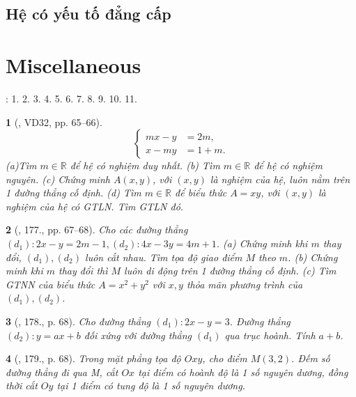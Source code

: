 \documentclass{article}
\newtheorem{baitoan}{}
\begin{document}
\subsection{Hệ có yếu tố đẳng cấp}


\section{Miscellaneous}
\cite[BTCCI, pp. 26--27]{SGK_Toan_9_Canh_Dieu_tap_1}: 1. 2. 3. 4. 5. 6. 7. 8. 9. 10. 11.

\begin{baitoan}[\cite{Tuyen_Toan_9_old}, VD32, pp. 65--66]
	\begin{equation*}
		\left\{\begin{split}
			mx - y &= 2m,\\
			x - my &= 1 + m.
		\end{split}\right.
	\end{equation*}
	(a)Tìm $m\in\mathbb{R}$ để hệ có nghiệm duy nhất. (b) Tìm $m\in\mathbb{R}$ để hệ có nghiệm nguyên. (c) Chứng minh $A(x,y)$, với $(x,y)$ là nghiệm của hệ, luôn nằm trên 1 đường thẳng cố định. (d) Tìm $m\in\mathbb{R}$ để biểu thức $A = xy$, với $(x,y)$ là nghiệm của hệ  có {\rm GTLN}. Tìm {\rm GTLN} đó.
\end{baitoan}

\begin{baitoan}[\cite{Tuyen_Toan_9_old}, 177., pp. 67--68]
	Cho các đường thẳng $(d_1):2x - y = 2m - 1,(d_2):4x - 3y = 4m + 1$. (a) Chứng minh khi $m$ thay đổi, $(d_1),(d_2)$ luôn cắt nhau. Tìm tọa độ giao điểm $M$ theo $m$. (b) Chứng minh khi $m$ thay đổi thì $M$ luôn di động trên 1 đường thẳng cố định. (c) Tìm {\rm GTNN} của biểu thức $A = x^2 + y^2$ với $x,y$ thỏa mãn phương trình của $(d_1),(d_2)$.
\end{baitoan}

\begin{baitoan}[\cite{Tuyen_Toan_9_old}, 178., p. 68]
	Cho đường thẳng $(d_1):2x - y = 3$. Đường thẳng $(d_2):y = ax + b$ đối xứng với đường thẳng $(d_1)$ qua trục hoành. Tính $a + b$.
\end{baitoan}

\begin{baitoan}[\cite{Tuyen_Toan_9_old}, 179., p. 68]
	Trong mặt phẳng tọa độ $Oxy$, cho điểm $M(3,2)$. Đếm số đường thẳng đi qua M, cắt $Ox$ tại điểm có hoành độ là 1 số nguyên dương, đồng thời cắt $Oy$ tại 1 điểm có tung độ là 1 số nguyên dương.
\end{baitoan}
\end{document}
